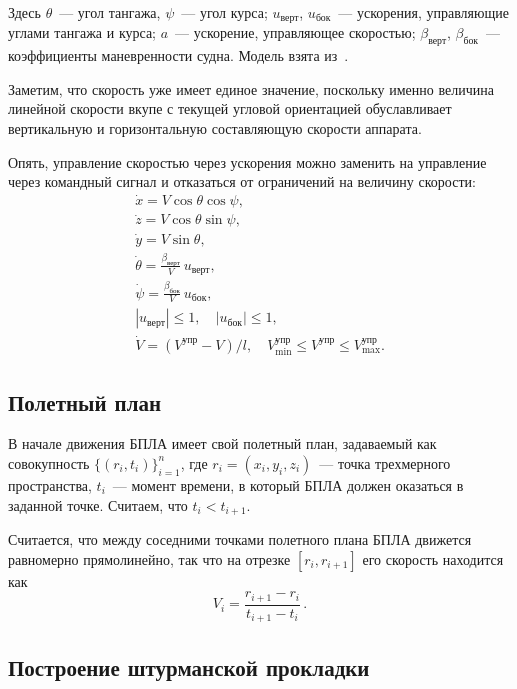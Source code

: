 \documentclass[a4paper,12pt]{article}
\begin{document}
Здесь $\theta$~--- угол тангажа, $\psi$~--- угол курса; $u_\text{верт}$, $u_\text{бок}$~--- ускорения, управляющие углами тангажа и курса; $a$~--- ускорение, управляющее скоростью; $\beta_\text{верт}$, $\beta_\text{бок}$~--- коэффициенты маневренности судна. Модель взята из~\cite{bib:GOST}.

Заметим, что скорость уже имеет единое значение, поскольку именно величина линейной скорости вкупе с текущей угловой ориентацией обуславливает вертикальную и горизонтальную составляющую скорости аппарата.

Опять, управление скоростью через ускорения можно заменить на управление через командный сигнал и отказаться от ограничений на величину скорости:
\begin{equation*}
  \begin{array}{l}
    \dot x = V \cos \theta \cos \psi, \\[0.75ex]
    \dot z = V \cos \theta \sin \psi, \\[0.75ex]
    \dot y = V \sin \theta, \\[0.75ex]
    \dot \theta = \frac{\beta_\text{верт}}{V} \, u_\text{верт}, \\[0.75ex]
    \dot \psi   = \frac{\beta_\text{бок}}{V} \, u_\text{бок}, \\[0.75ex]
    |u_\text{верт}| \leqslant 1, 
      \quad |u_\text{бок}| \leqslant 1, \\[0.75ex]
    \dot V = (V^\text{упр} - V) / l, \quad  
      V^\text{упр}_{\min} \leqslant V^\text{упр} \leqslant V^\text{упр}_{\max}.
  \end{array}
\end{equation*}


\subsection{Полетный план}

В начале движения БПЛА имеет свой полетный план, задаваемый как совокупность $\{(r_i, t_i)\}_{i=1}^n$, где $r_i=(x_i,y_i,z_i)$~--- точка трехмерного пространства, $t_i$~--- момент времени, в который БПЛА должен оказаться в заданной точке. Считаем, что $t_i < t_{i+1}$.

Считается, что между соседними точками полетного плана БПЛА движется равномерно прямолинейно, так что на отрезке $[r_i,r_{i+1}]$ его скорость находится как
$$
  V_i = \frac{r_{i+1} - r_i}{t_{i+1} - t_i}\,.
$$

\subsection{Построение штурманской прокладки}
\end{document}
